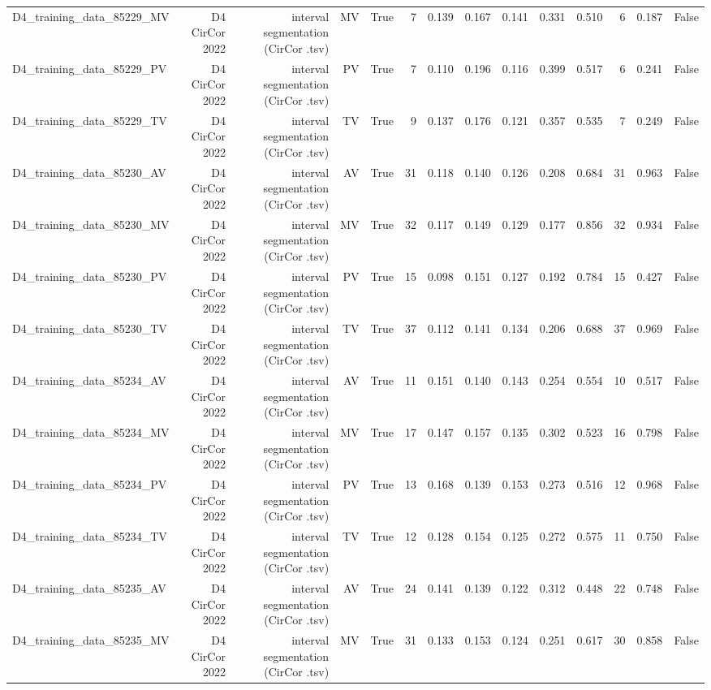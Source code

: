 \begin{table}[htbp]
\begin{tabular}{lrrrrrrrrrrrrr}
    D4\_training\_data\_85229\_MV & D4 CirCor 2022 & interval segmentation (CirCor .tsv) & MV & True & 7 & 0.139 & 0.167 & 0.141 & 0.331 & 0.510 & 6 & 0.187 & False \\
    D4\_training\_data\_85229\_PV & D4 CirCor 2022 & interval segmentation (CirCor .tsv) & PV & True & 7 & 0.110 & 0.196 & 0.116 & 0.399 & 0.517 & 6 & 0.241 & False \\
    D4\_training\_data\_85229\_TV & D4 CirCor 2022 & interval segmentation (CirCor .tsv) & TV & True & 9 & 0.137 & 0.176 & 0.121 & 0.357 & 0.535 & 7 & 0.249 & False \\
    D4\_training\_data\_85230\_AV & D4 CirCor 2022 & interval segmentation (CirCor .tsv) & AV & True & 31 & 0.118 & 0.140 & 0.126 & 0.208 & 0.684 & 31 & 0.963 & False \\
    D4\_training\_data\_85230\_MV & D4 CirCor 2022 & interval segmentation (CirCor .tsv) & MV & True & 32 & 0.117 & 0.149 & 0.129 & 0.177 & 0.856 & 32 & 0.934 & False \\
    D4\_training\_data\_85230\_PV & D4 CirCor 2022 & interval segmentation (CirCor .tsv) & PV & True & 15 & 0.098 & 0.151 & 0.127 & 0.192 & 0.784 & 15 & 0.427 & False \\
    D4\_training\_data\_85230\_TV & D4 CirCor 2022 & interval segmentation (CirCor .tsv) & TV & True & 37 & 0.112 & 0.141 & 0.134 & 0.206 & 0.688 & 37 & 0.969 & False \\
    D4\_training\_data\_85234\_AV & D4 CirCor 2022 & interval segmentation (CirCor .tsv) & AV & True & 11 & 0.151 & 0.140 & 0.143 & 0.254 & 0.554 & 10 & 0.517 & False \\
    D4\_training\_data\_85234\_MV & D4 CirCor 2022 & interval segmentation (CirCor .tsv) & MV & True & 17 & 0.147 & 0.157 & 0.135 & 0.302 & 0.523 & 16 & 0.798 & False \\
    D4\_training\_data\_85234\_PV & D4 CirCor 2022 & interval segmentation (CirCor .tsv) & PV & True & 13 & 0.168 & 0.139 & 0.153 & 0.273 & 0.516 & 12 & 0.968 & False \\
    D4\_training\_data\_85234\_TV & D4 CirCor 2022 & interval segmentation (CirCor .tsv) & TV & True & 12 & 0.128 & 0.154 & 0.125 & 0.272 & 0.575 & 11 & 0.750 & False \\
    D4\_training\_data\_85235\_AV & D4 CirCor 2022 & interval segmentation (CirCor .tsv) & AV & True & 24 & 0.141 & 0.139 & 0.122 & 0.312 & 0.448 & 22 & 0.748 & False \\
    D4\_training\_data\_85235\_MV & D4 CirCor 2022 & interval segmentation (CirCor .tsv) & MV & True & 31 & 0.133 & 0.153 & 0.124 & 0.251 & 0.617 & 30 & 0.858 & False \\

\end{tabular}
\end{table}
